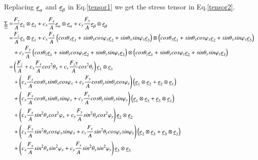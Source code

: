 \documentclass[3p,times,procedia,number]{elsarticle}
\begin{document}
Replacing $\uline{e}_{\alpha}$ and $\uline{e}_{\beta}$ in Eq.\eqref{tensor1} we get the stress tensor in Eq.\eqref{tensor2}. 
 \begin{equation}
 	\begin{split}
 		\uline{\uline{\Sigma}}=&\dfrac{F_z}{A}\uline{e}_1\otimes \uline{e}_1+c_x\dfrac{F_x}{A}\uline{e}_{\alpha}\otimes \uline{e}_{\alpha}+c_y\dfrac{F_y}{A}\uline{e}_{\beta}\otimes \uline{e}_{\beta}
 		\\=&\dfrac{F_z}{A}\uline{e}_1\otimes \uline{e}_1+c_x\dfrac{F_x}{A}\left(cos\theta_x\uline{e}_1+sin\theta_xcos\varphi_x\uline{e}_2+sin\theta_xsin\varphi_x\uline{e}_3 \right) \otimes\left(cos\theta_x\uline{e}_1+sin\theta_xcos\varphi_x\uline{e}_2+sin\theta_xsin\varphi_x\uline{e}_3 \right)
 		\\&+c_y\dfrac{F_y}{A}\left( cos\theta_y\uline{e}_1+sin\theta_ycos\varphi_y\uline{e}_2+sin\theta_ysin\varphi_y\uline{e}_3\right) \otimes\left( cos\theta_y\uline{e}_1+sin\theta_ycos\varphi_y\uline{e}_2+sin\theta_ysin\varphi_y\uline{e}_3\right)
 		\\=&\left(\dfrac{F_z}{A} +c_x\dfrac{F_x}{A}cos^2\theta_x+c_y\dfrac{F_zy}{A}cos^2\theta_y\right) \uline{e}_1\otimes \uline{e}_1
 		\\&+\left(c_x\dfrac{F_x}{A}cos\theta_xsin\theta_x cos\varphi_x+c_y\dfrac{F_y}{A}cos\theta_ysin\theta_y cos\varphi_y\right) \left( \uline{e}_1\otimes \uline{e}_2+\uline{e}_2\otimes \uline{e}_1\right) 
 		\\&+\left(c_x\dfrac{F_x}{A}cos\theta_xsin\theta_x sin\varphi_x+c_y\dfrac{F_y}{A}cos\theta_ysin\theta_y sin\varphi_y\right) \left( \uline{e}_1\otimes \uline{e}_3+\uline{e}_3\otimes \uline{e}_1\right) 
 		\\&+\left(c_x\dfrac{F_x}{A}sin^2\theta_xcos^2\varphi_x+c_y\dfrac{F_y}{A}sin^2\theta_y cos^2\varphi_y\right) \uline{e}_2\otimes \uline{e}_2
 		\\&+\left(c_x\dfrac{F_x}{A}sin^2\theta_x cos\varphi_xsin\varphi_x+c_y\dfrac{F_y}{A}sin^2\theta_y cos\varphi_ysin\varphi_y\right) \left( \uline{e}_2\otimes \uline{e}_3+\uline{e}_3\otimes \uline{e}_2\right) 
 		\\&+\left(c_x\dfrac{F_x}{A}sin^2\theta_xsin^2\varphi_x+c_y\dfrac{F_y}{A}sin^2\theta_y sin^2\varphi_y\right) \uline{e}_3\otimes \uline{e}_3
 	\end{split}
 	\label{tensor2}
 \end{equation}
 
\end{document}
